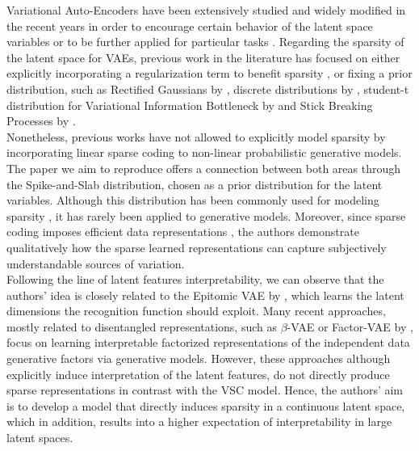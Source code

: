 Variational Auto-Encoders have been extensively studied \supercite{Doersch2016} and widely modified in the recent years in order to encourage certain behavior of the latent space variables \supercite{Nalisnick2016, rolfe2016discrete, casale2018gaussian} or to be further applied for particular tasks \supercite{chen2016variational,walker2016uncertain, kusner2017grammar, jin2018junction}. Regarding the sparsity of the latent space for VAEs, previous work in the literature has focused on either explicitly incorporating a regularization term to benefit sparsity \supercite{louizos2017learning}, or fixing a prior distribution, such as Rectified Gaussians by \supercite{salimans2016structured},  discrete distributions by \supercite{van2017neural}, student-t distribution for Variational Information Bottleneck by \supercite{Chalk2016} and Stick Breaking Processes by \supercite{Nalisnick2016}. \\

Nonetheless, previous works have not allowed to explicitly model sparsity by incorporating linear sparse coding to non-linear probabilistic generative models.  The paper we aim to reproduce offers a connection between both areas through the  Spike-and-Slab distribution, chosen as a prior distribution for the latent variables. Although this distribution has been commonly used for modeling sparsity \supercite{Goodfellow2012}, it has rarely been applied to generative models. Moreover, since sparse coding imposes efficient data representations \supercite{ishwaran2005spike, titsias2011spike, bengio2013representation}, the authors demonstrate qualitatively how the sparse learned representations can capture subjectively understandable sources of variation. \\

Following the line of latent features interpretability, we can observe that the authors' idea is closely related to the Epitomic VAE by \supercite{yeung2016epitomic}, which learns the latent dimensions the recognition function should exploit. Many recent approaches, mostly related to disentangled representations, such as  $\beta$-VAE  \supercite{higgins2016beta, Burgess2018} or Factor-VAE by \supercite{Kim2018}, focus on learning interpretable factorized representations of the independent data generative factors via generative models. However, these approaches although explicitly induce interpretation of the latent features, do not directly produce sparse representations in contrast with the VSC model. Hence, the authors' aim is to develop a model that directly induces sparsity in a continuous latent space, which in addition, results into a higher expectation of interpretability in large latent spaces. \\

